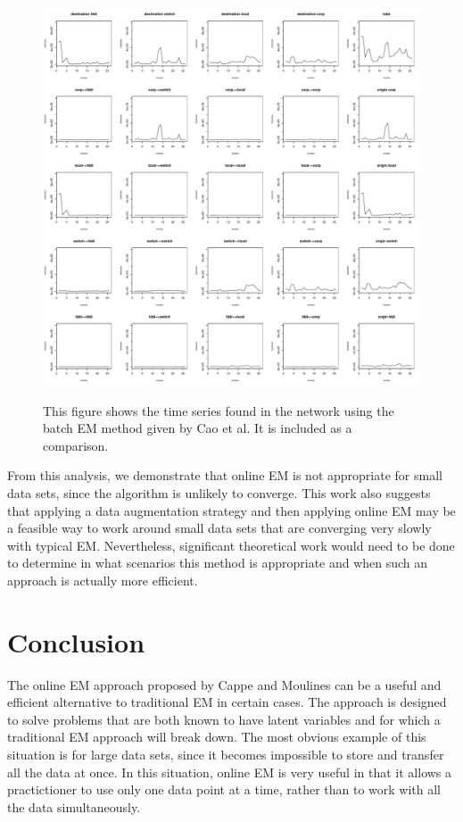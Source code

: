 \documentclass[12pt]{article}
\begin{document}
\begin{figure}[b!]
\centering
\includegraphics[width = 1\textwidth]{novelty_normal_em.PDF}\\
\caption{This figure shows the time series found in the network using the batch EM method given by Cao et al. It is included as a comparison.} \label{f2}
\end{figure}

From this analysis, we demonstrate that online EM is not appropriate for small data sets, since the algorithm is unlikely to converge. This work also suggests that applying a data augmentation strategy and then applying online EM may be a feasible way to work around small data sets that are converging very slowly with typical EM.  Nevertheless, significant theoretical work would need to be done to determine in what scenarios this method is appropriate and when such an approach is actually more efficient. 

\clearpage
\section{Conclusion}
The online EM approach proposed by Cappe and Moulines can be a useful and efficient alternative to traditional EM in certain cases. The approach is designed to solve problems that are both known to have latent variables and for which a traditional EM approach will break down. The most obvious example of this situation is for large data sets, since it becomes impossible to store and transfer all the data at once. In this situation, online EM is very useful in that it allows a practictioner to use only one data point at a time, rather than to work with all the data simultaneously.\\
\end{document}
